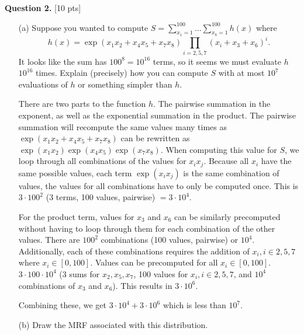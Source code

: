 \documentclass[11pt]{article}
\begin{document}
{\bf Question 2.} [10 pts]

\begin{enumerate}
\item[(a)] Suppose you wanted to compute $S = \sum^{100}_{x_1 = 1} \dots \sum^{100}_{x_8 = 1} h(x)$ where
\begin{equation*}
    h(x) = \exp(x_1 x_2 + x_4 x_5 + x_7 x_8) \prod_{i=2,5,7} (x_i + x_3 + x_6)^i.
\end{equation*}
It looks like the sum has $100^8 = 10^{16}$ terms, so it seems we must evaluate $h$ $10^{16}$ times. Explain (precisely) how you can compute $S$ with at most $10^7$ evaluations of $h$ or something simpler than $h$.

\begin{answertext}{7.5cm}{}

There are two parts to the function $h$. The pairwise summation in the exponent, as well as the exponential summation in the product. The pairwise summation will recompute the same values many times as $\exp(x_1x_2+x_4x_5+x_7x_8)$ can be rewritten as $\exp(x_1x_2)\exp(x_4x_5)\exp(x_7x_8)$. When computing this value for $S$, we loop through all combinations of the values for $x_ix_j$. Because all $x_i$ have the same possible values, each term $\exp(x_ix_j)$ is the same combination of values, the values for all combinations have to only be computed once. This is $3 \cdot 100^2$ (3 terms, 100 values, pairwise) $= 3 \cdot 10^4$.

For the product term, values for $x_3$ and $x_6$ can be similarly precomputed without having to loop through them for each combination of the other values. There are $100^2$ combinations (100 values, pairwise) or $10^4$. Additionally, each of these combinations requires the addition of $x_i, i \in 2, 5, 7$ where $x_i \in [0, 100]$. Values can be precomputed for all $x_i \in [0,100]$. $3 \cdot 100 \cdot 10^4$ (3 sums for $x_2, x_5, x_7$, 100 values for $x_i, i \in 2, 5, 7$, and $10^4$ combinations of $x_3$ and $x_6$). This results in $3 \cdot 10^6$.

Combining these, we get $3 \cdot 10^4 + 3 \cdot 10^6$ which is less than $10^7$. 

\end{answertext} 

\item[(b)] Draw the MRF associated with this distribution.

\begin{answertext}{5cm}{}

\begin{tikzpicture}[>=stealth, node distance=1.5cm]


\end{tikzpicture}
\end{answertext}
\end{enumerate}
\end{document}
